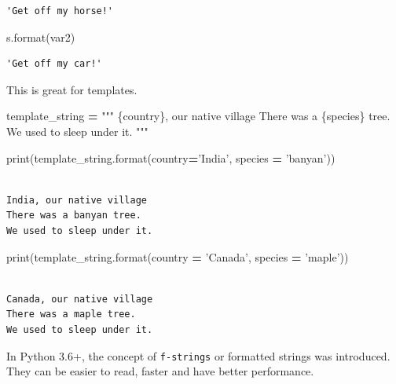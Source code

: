 \documentclass[
  letterpaper,
]{scrbook}
\newenvironment{Shaded}{\begin{snugshade}}{\end{snugshade}}
\newcommand{\BuiltInTok}[1]{#1}
\newcommand{\NormalTok}[1]{#1}
\newcommand{\OperatorTok}[1]{\textcolor[rgb]{0.81,0.36,0.00}{\textbf{#1}}}
\newcommand{\SpecialCharTok}[1]{\textcolor[rgb]{0.00,0.00,0.00}{#1}}
\newcommand{\StringTok}[1]{\textcolor[rgb]{0.31,0.60,0.02}{#1}}
\begin{document}
\begin{verbatim}
'Get off my horse!'
\end{verbatim}

\begin{Shaded}
\begin{Highlighting}[]
\NormalTok{s.}\BuiltInTok{format}\NormalTok{(var2)}
\end{Highlighting}
\end{Shaded}

\begin{verbatim}
'Get off my car!'
\end{verbatim}

This is great for templates.

\begin{Shaded}
\begin{Highlighting}[]
\NormalTok{template_string }\OperatorTok{=} \StringTok{"""}
\SpecialCharTok{\{country\}}\StringTok{, our native village}
\StringTok{There was a }\SpecialCharTok{\{species\}}\StringTok{ tree.}
\StringTok{We used to sleep under it.}
\StringTok{"""}

\BuiltInTok{print}\NormalTok{(template_string.}\BuiltInTok{format}\NormalTok{(country}\OperatorTok{=}\StringTok{'India'}\NormalTok{, species }\OperatorTok{=} \StringTok{'banyan'}\NormalTok{))}
\end{Highlighting}
\end{Shaded}

\begin{verbatim}

India, our native village
There was a banyan tree.
We used to sleep under it.
\end{verbatim}

\begin{Shaded}
\begin{Highlighting}[]
\BuiltInTok{print}\NormalTok{(template_string.}\BuiltInTok{format}\NormalTok{(country }\OperatorTok{=} \StringTok{'Canada'}\NormalTok{, species }\OperatorTok{=} \StringTok{'maple'}\NormalTok{))}
\end{Highlighting}
\end{Shaded}

\begin{verbatim}

Canada, our native village
There was a maple tree.
We used to sleep under it.
\end{verbatim}

In Python 3.6+, the concept of \texttt{f-strings} or formatted strings was introduced. They can be easier to read, faster and have better performance.
\end{document}

